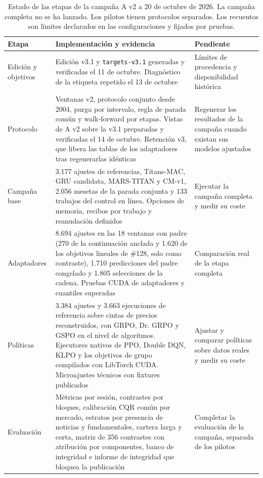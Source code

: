 \documentclass[11pt,a4paper]{report}
\begin{document}
\begin{table}[htbp]
\centering
\small
\caption{Estado de las etapas de la campaña A v2 a 20 de octubre de 2026.
La campaña completa no se ha lanzado. Los pilotos tienen protocolos separados.
Los recuentos son límites declarados en las configuraciones y fijados por
pruebas.}
\label{tab:estado}
\begin{tabular}{L{2.6cm}L{5.6cm}L{4.8cm}}
\toprule
Etapa & Implementación y evidencia & Pendiente \\
\midrule
Edición y objetivos & Edición v3.1 y \texttt{targets-v3.1} generadas y
verificadas el 11 de octubre. Diagnóstico de la etiqueta repetido el 13 de
octubre & Límites de procedencia y disponibilidad histórica \\
Protocolo & Ventanas v2, protocolo conjunto desde 2004, purga por intervalo,
regla de parada común y walk-forward por etapas. Vistas de A v2 sobre la v3.1
preparadas y verificadas el 14 de octubre. Retención v3, que libera las tablas
de los adaptadores tras regenerarlas idénticas & Regenerar los resultados de
la campaña cuando existan sus modelos ajustados \\
Campaña base & 3.177 ajustes de referencias, Titans-MAC, GRU candidata,
MARS-TITAN y CM-v1, 2.056 mesetas de la parada conjunta y 133 trabajos del
control en línea. Opciones de memoria, recibos por trabajo y reanudación
definidos & Ejecutar la campaña completa y medir su coste \\
Adaptadores & 8.694 ajustes en las 18 ventanas con padre (270 de la continuación
anclada y 1.620 de los objetivos lineales de \#128, solo como contraste), 1.710 predicciones
del padre congelado y 1.805 selecciones de la cadena. Pruebas CUDA de
adaptadores y cuantiles superadas & Comparación real de la etapa completa \\
Políticas & 3.384 ajustes y 3.663 ejecuciones de referencia sobre cintas de
precios reconstruidos, con GRPO, Dr. GRPO y GSPO en el nivel de algoritmos.
Ejecutores nativos de PPO, Double DQN, KLPO y los objetivos de grupo compilados
con LibTorch CUDA. Microajustes técnicos con fixtures publicados & Ajustar y
comparar políticas sobre datos reales y medir su coste \\
Evaluación & Métricas por sesión, contrastes por bloques, calibración CQR
común por mercado, estratos por presencia de noticias y fundamentales, cartera
larga y corta, matriz de 356 contrastes con atribución por componentes, banco
de integridad e informe de integridad que bloquea la publicación & Completar la
evaluación de la campaña, separada de los pilotos \\
\bottomrule
\end{tabular}
\end{table}
\end{document}
